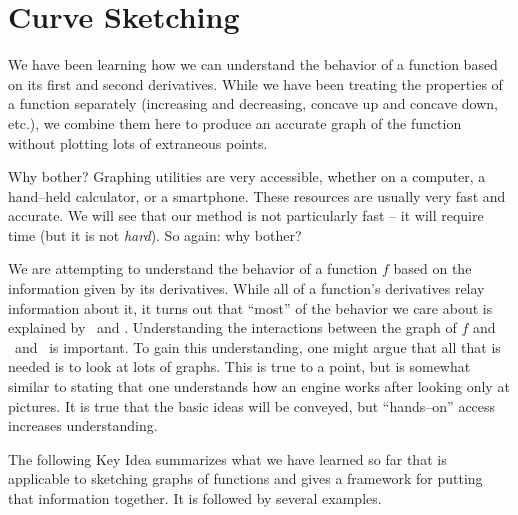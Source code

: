 \section{Curve Sketching}\label{sec:sketch}


We have been learning how we can understand the behavior of a function based on its first and second derivatives. While we have been treating the properties of a function separately (increasing and decreasing, concave up and concave down, etc.), we combine them here to produce an accurate graph of the function without plotting lots of extraneous points.

Why bother? Graphing utilities are very accessible, whether on a computer, a hand--held calculator, or a smartphone. These resources are usually very fast and accurate. We will see that our method is not particularly fast -- it will require time (but it is not \textit{hard}). So again: why bother?

We are attempting to understand the behavior of a function $f$ based on the information given by its derivatives. While all of a function's derivatives relay information about it, it turns out that ``most'' of the behavior we care about is explained by \fp\ and \fpp. Understanding the interactions between the graph of $f$ and \fp\ and \fpp\ is important. To gain this understanding, one might argue that all that is needed is to look at lots of graphs. This is true to a point, but is somewhat similar to stating that one understands how an engine works after looking only at pictures. It is true that the basic ideas will be conveyed, but ``hands--on'' access increases understanding.

The following Key Idea summarizes what we have learned so far that is applicable to sketching graphs of functions and gives a framework for putting that information together. It is followed by several examples.

